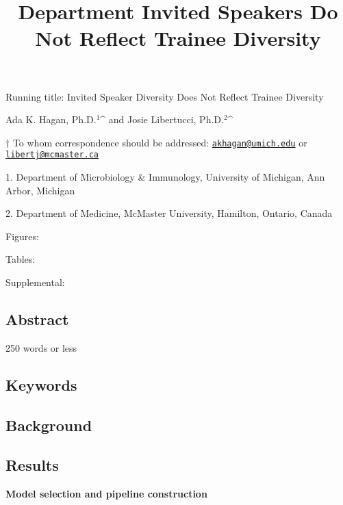 \documentclass[10pt,]{article}
\title{\textbf{Department Invited Speakers Do Not Reflect Trainee Diversity}}
\author{}
\date{}
\begin{document}
\maketitle

\vspace{30mm}

Running title: Invited Speaker Diversity Does Not Reflect Trainee
Diversity

\vspace{35mm}

Ada K. Hagan, Ph.D.\({^1}\)\^{} and Josie Libertucci, Ph.D.\({^2}\)\^{}

\vspace{35mm}

\(\dagger\) To whom correspondence should be addressed:
\href{mailto:akhagan@umich.edu}{\nolinkurl{akhagan@umich.edu}} or
\href{mailto:libertj@mcmaster.ca}{\nolinkurl{libertj@mcmaster.ca}}

1. Department of Microbiology \& Immunology, University of Michigan, Ann
Arbor, Michigan

2. Department of Medicine, McMaster University, Hamilton, Ontario,
Canada

Figures:

Tables:

Supplemental:

\newpage

\linenumbers

\subsection{Abstract}\label{abstract}

250 words or less

\subsection{Keywords}\label{keywords}

\newpage

\subsection{Background}\label{background}

\subsection{Results}\label{results}

\textbf{Model selection and pipeline construction}
\end{document}
